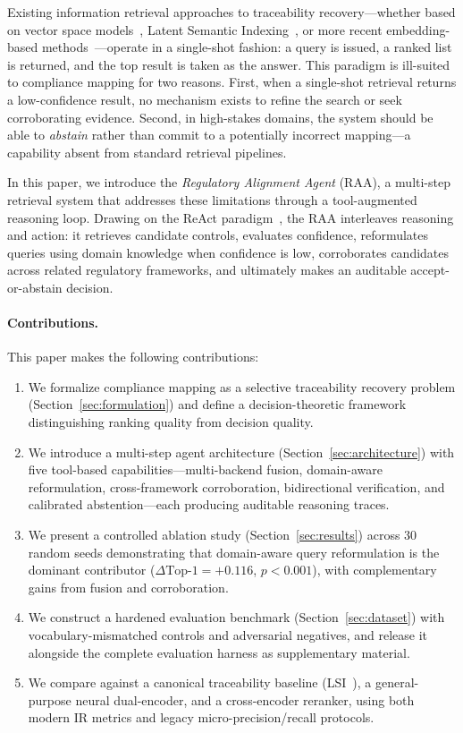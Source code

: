 \documentclass[a4paper,fleqn]{cas-sc}
\begin{document}
Existing information retrieval approaches to traceability recovery---whether based on vector space models~\citep{Antoniol2002}, Latent Semantic Indexing~\citep{MarcusMaletic2003}, or more recent embedding-based methods~\citep{Guo2017}---operate in a single-shot fashion: a query is issued, a ranked list is returned, and the top result is taken as the answer.
This paradigm is ill-suited to compliance mapping for two reasons.
First, when a single-shot retrieval returns a low-confidence result, no mechanism exists to refine the search or seek corroborating evidence.
Second, in high-stakes domains, the system should be able to \emph{abstain} rather than commit to a potentially incorrect mapping---a capability absent from standard retrieval pipelines.

In this paper, we introduce the \emph{Regulatory Alignment Agent} (RAA), a multi-step retrieval system that addresses these limitations through a tool-augmented reasoning loop.
Drawing on the ReAct paradigm~\citep{Yao2023}, the RAA interleaves reasoning and action: it retrieves candidate controls, evaluates confidence, reformulates queries using domain knowledge when confidence is low, corroborates candidates across related regulatory frameworks, and ultimately makes an auditable accept-or-abstain decision.

\paragraph{Contributions.}
This paper makes the following contributions:
\begin{enumerate}
    \item We formalize compliance mapping as a selective traceability recovery problem (Section~\ref{sec:formulation}) and define a decision-theoretic framework distinguishing ranking quality from decision quality.

    \item We introduce a multi-step agent architecture (Section~\ref{sec:architecture}) with five tool-based capabilities---multi-backend fusion, domain-aware reformulation, cross-framework corroboration, bidirectional verification, and calibrated abstention---each producing auditable reasoning traces.

    \item We present a controlled ablation study (Section~\ref{sec:results}) across 30 random seeds demonstrating that domain-aware query reformulation is the dominant contributor ($\Delta\text{Top-1} = +0.116$, $p < 0.001$), with complementary gains from fusion and corroboration.

    \item We construct a hardened evaluation benchmark (Section~\ref{sec:dataset}) with vocabulary-mismatched controls and adversarial negatives, and release it alongside the complete evaluation harness as supplementary material.

    \item We compare against a canonical traceability baseline (LSI~\citep{MarcusMaletic2003}), a general-purpose neural dual-encoder, and a cross-encoder reranker, using both modern IR metrics and legacy micro-precision/recall protocols.
\end{enumerate}
\end{document}
